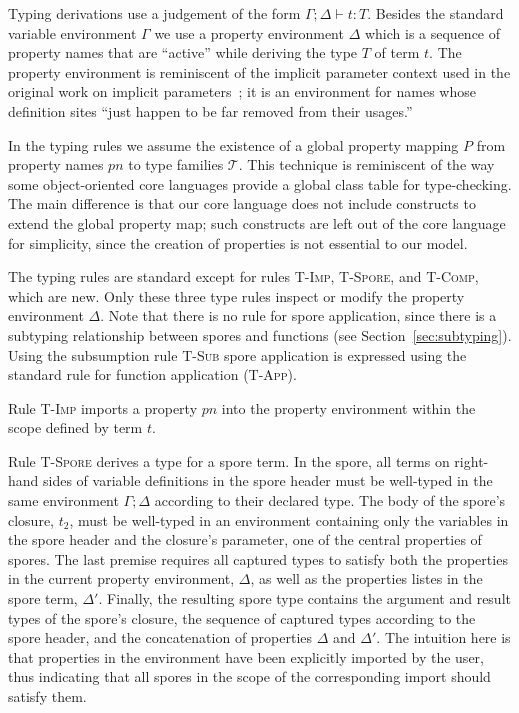 Typing derivations use a judgement of the form $\Gamma ; \Delta \vdash t : T$. Besides the standard variable environment $\Gamma$ we use a property environment $\Delta$ which is a sequence of property names that are ``active'' while deriving the type $T$ of term $t$. The property environment is reminiscent of the implicit parameter context used in the original work on implicit parameters~\cite{LewisLMS00}; it is an environment for names whose definition sites ``just happen to be far removed from their usages.''

In the typing rules we assume the existence of a global property mapping $P$ from property names $pn$ to type families $\mathcal{T}$. This technique is reminiscent of the way some object-oriented core languages provide a global class table for type-checking. The main difference is that our core language does not include constructs to extend the global property map; such constructs are left out of the core language for simplicity, since the creation of properties is not essential to our model.

The typing rules are standard except for rules \textsc{T-Imp}, \textsc{T-Spore}, and \textsc{T-Comp}, which are new. Only these three type rules inspect or modify the property environment $\Delta$. Note that there is no rule for spore application, since there is a subtyping relationship between spores and functions (see Section~\ref{sec:subtyping}). Using the subsumption rule \textsc{T-Sub} spore application is expressed using the standard rule for function application (\textsc{T-App}).

Rule \textsc{T-Imp} imports a property $pn$ into the property environment within the scope defined by term $t$.

Rule \textsc{T-Spore} derives a type for a spore term. In the spore, all terms on right-hand sides of variable definitions in the spore header must be well-typed in the same environment $\Gamma ; \Delta$ according to their declared type. The body of the spore's closure, $t_2$, must be well-typed in an environment containing only the variables in the spore header and the closure's parameter, one of the central properties of spores. The last premise requires all captured types to satisfy both the properties in the current property environment, $\Delta$, as well as the properties listes in the spore term, $\Delta'$. Finally, the resulting spore type contains the argument and result types of the spore's closure, the sequence of captured types according to the spore header, and the concatenation of properties $\Delta$ and $\Delta'$. The intuition here is that properties in the environment have been explicitly imported by the user, thus indicating that all spores in the scope of the corresponding import should satisfy them.

